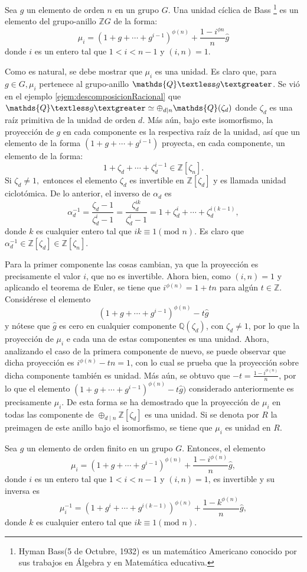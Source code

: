 \begin{definicion}
Sea $g$ un elemento de orden $n$ en un grupo $G$. Una unidad cíclica de Bass \footnote{Hyman Bass(5 de Octubre, 1932) es un matemático Americano conocido por sus trabajos en Álgebra y en Matemática educativa.  } es un elemento del grupo-anillo $\mathds{Z}G$ de la forma:
\[ \mu_{i} = (1+g+\cdots+g^{i-1})^{\phi(n)} + \frac{1-i^{\phi{n}}}{n}\hat{g}  \] donde $i$ es un entero tal que $1<i<n-1$ y $(i,n) = 1$.
\end{definicion}
Como es natural, se debe mostrar que $\mu_i$ es una unidad. Es claro que, para $g \in G, \mu_i$ pertenece al grupo-anillo $\mathds{Q}\textless g \textgreater$. Se vió en el ejemplo \ref{ejem:descomposicionRacional} que $\mathds{Q}\textless g \textgreater \simeq \oplus_{d \mid  n} \mathds{Q}(\zeta_d)$ donde $\zeta_d$ es una raíz primitiva de la unidad de orden $d$. Más aún, bajo este isomorfismo, la proyección de $g$ en cada componente es la respectiva raíz de la unidad, así que un elemento de la forma $(1+g+\cdots+g^{i-1})$ proyecta, en cada componente, un elemento de la forma: \[ 1+\zeta_d + \cdots +\zeta_d^{i-1} \in \mathds{Z}[\zeta_n].  \] Si $\zeta_d \neq 1,$ entonces el elemento $\zeta_d$ es invertible en $\mathds{Z}[\zeta_d]$ y es llamada unidad ciclotómica. De lo anterior, el inverso de $\alpha_d$ es \[ \alpha_d^{-1} = \frac{\zeta_d-1}{\zeta_d^i-1} = \frac{\zeta_d^{ik}}{\zeta_d^{i}-1} = 1+\zeta_d^i + \cdots + \zeta_d^{i(k-1)}, \] donde $k$ es cualquier entero tal que $ik \equiv 1 (\mbox{mod } n) $. Es claro que $\alpha_d^{-1} \in \mathds{Z}[\zeta_d] \in \mathds{Z}[\zeta_n]$.

Para la primer componente las cosas cambian, ya que la proyección es precisamente el valor $i$, que no es invertible. Ahora bien, como $(i,n) = 1$ y aplicando el teorema de Euler, se tiene que $i^{\phi(n)} = 1 + tn$ para algún $t \in \mathds{Z}$. Considérese el elemento \[  (1+g+\cdots +g^{i-1})^{\phi(n)} -t\hat{g} \] y nótese que $\hat{g}$ es cero en cualquier componente $\mathds{Q}(\zeta_d)$, con $\zeta_d \neq 1$, por lo que la proyección de $\mu_i$ e cada una de estas componentes es una unidad. Ahora, analizando el caso de la primera componente de nuevo, se puede observar que dicha proyección es $i^{\phi(n)}-tn = 1$, con lo cual se prueba que la proyección sobre dicha componente también es unidad. Más aún, se obtuvo que $-t = \frac{1-i^{\phi(n)}}{n}$, por lo que el elemento $(1+g+\cdots+g^{i-1})^{\phi(n)} -t\hat{g})$ considerado anteriormente es precisamente $\mu_i$. De esta forma se ha demostrado que la proyección de $\mu_i$ en todas las componente de $\oplus_{d \mid n}\mathds{Z}[\zeta_d]$ es una unidad. Si se denota por $R$ la preimagen de este anillo bajo el isomorfismo, se tiene que $\mu_i$ es unidad en $R$.
\begin{proposicion}
Sea $g$ un elemento de orden finito en un grupo $G$. Entonces, el elemento \[  \mu_i = (1+g+\cdots+g^{i-1})^{\phi(n)} + \frac{1-i^{\phi(n)}}{n}\hat{g}, \] donde $i$ es un entero tal que $1<i<n-1$ y $(i,n) = 1$, es invertible y su inversa es \[  \mu_i^{-1} = (1+g^i + \cdots + g^{i(k-1)})^{\phi(n)} + \frac{1-k^{\phi(n)}}{n}\hat{g},\] donde $k$ es cualquier entero tal que $ik \equiv 1 (\mbox{mod } n)$.
\end{proposicion}

